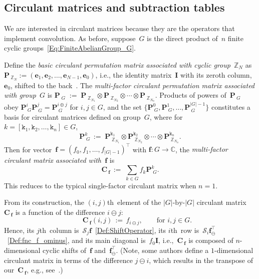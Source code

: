 \documentclass[letterpaper,11pt]{article}
\newcommand{\bs}[1]{{\boldsymbol{#1}}}
\newcommand{\gr}[1]{( #1 )}
\newcommand{\abs}[1]{\vert #1 \vert}
\newcommand{\Set}[1]{\big\{ #1 \big\}}
\newcommand{\vect}[1]{[ #1 ]}
\newcommand{\C}{\mathbb C}
\newcommand{\Int}{\mathbb Z}
\newcommand{\Cbasis}{\bs{P}} %
\newcommand{\bcode}[1]{\texttt{#1}}
\newcommand{\ith}{$i$th}
\newcommand{\jth}{$j$th}
\newcommand{\ijth}{$(i,j)$th}
\theoremstyle{definition} \newtheorem{remark}{Remark}
\begin{document}
\subsection{Circulant matrices and subtraction tables}
We are interested in circulant matrices because they are the operators that implement convolution. As before, suppose~$G$ is the direct product of~$n$ finite cyclic groups~\eqref{Eq:FiniteAbelianGroup_G}.

Define the \emph{basic circulant permutation matrix associated with cyclic group~$\Int_N$} as $\Cbasis_{\:\!\!\Int_N} := \gr{\bs{e}_1,\bs{e}_2,\ldots,\bs{e}_{N-1},\bs{e}_0}$, i.e., the identity matrix~$\bs{I}$ with its zeroth column,~$\bs{e}_0$, shifted to the back~\cite[\S0.9.6]{hornJohnson1985MatrixAnalysis}. The \emph{multi-factor circulant permutation matrix associated with group~$G$} is $\Cbasis_{\;\!\!G} \;:=\; \Cbasis_{\;\!\!\Int_{N_1}} \otimes \Cbasis_{\;\!\!\Int_{N_2}} \otimes \cdots \otimes \Cbasis_{\;\!\!\Int_{N_n}}$. Products of powers of~$\Cbasis_{\:\!\!G}$ obey
$\Cbasis_{\:\!\!G}^i \Cbasis_{\:\!\!G}^j = \Cbasis_{\:\!\!G}^{i\oplus j}$ for $i,j\in G$, and the set $\Set{\Cbasis_{\:\!\!G}^0,\Cbasis_{\:\!\!G}^1,\ldots,\Cbasis_{\:\!\!G}^{\abs{G}-1}}$ constitutes a basis for circulant matrices defined on group~$G$, where for $k=\vect{\bcode{k}_1,\bcode{k}_2,\ldots,\bcode{k}_n}\in G$,
\begin{equation} \label{Def:PermMatrix_KG_basis}
\Cbasis_{\;\!\!G}^k \,:=\; \Cbasis_{\;\!\!\Int_{N_1}}^{\bcode{k}_1} \otimes \Cbasis_{\;\!\!\Int_{N_2}}^{\bcode{k}_2} \otimes \cdots \otimes \Cbasis_{\;\!\!\Int_{N_n}}^{\bcode{k}_n}.
\end{equation}
Then for vector~$\bs{f} = \gr{f_0,f_1,\ldots,f_{\abs{G}-1}}^\top$ with $\bs{f}:G\rightarrow\C$, the \emph{multi-factor circulant matrix associated with~$\bs{f}$} is
\begin{equation} \label{Def:CircMatrix_KG_basis}
\bs{C}_{\:\!\!\bs{f}} \,:=\; \sum_{k\in G} f_k \Cbasis_{\;\!\!G}^k.
\end{equation}
This reduces to the typical single-factor circulant matrix when $n=1$.

From its construction, the \ijth\ element of the $\abs{G}\text{-by-}\abs{G}$ circulant matrix~$\bs{C}_{\:\!\!\bs{f}}$ is a function of the difference $i \ominus j$:
\begin{equation*} \label{Def:CircMatrix_Cf_ij}
\qquad\bs{C}_{\:\!\!\bs{f}}\gr{i,j} \,:=\, f_{i \ominus j}, \qquad \text{for } i,j\in G.
\end{equation*}
Hence, its \jth\ column is~$\mathcal{S}_j\bs{f}$~\eqref{Def:ShiftOperator}, its \ith\ row is~$\mathcal{S}_i\bs{f}_{\!\ominus}^\top$~\eqref{Def:fnc_f_ominus}, and its main diagonal is~$f_0\bs{I}$, i.e.,~$\bs{C}_{\:\!\!\bs{f}}$ is composed of $n$-dimensional cyclic shifts of~$\bs{f}$ and~$\bs{f}_{\!\ominus}^\top$. (Note, some authors define a $1$-dimensional circulant matrix in terms of the difference $j \ominus i$, which results in the transpose of our~$\bs{C}_{\:\!\!\bs{f}}$, e.g., see~\cite[\S0.9.6]{hornJohnson1985MatrixAnalysis}.)
\end{document}
